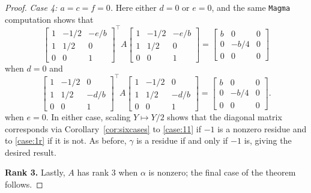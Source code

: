 \documentclass[10pt,a4paper]{amsart}
\numberwithin{equation}{section}
\numberwithin{figure}{section}
\numberwithin{table}{section}
\theoremstyle{definition}
\theoremstyle{plain}
\theoremstyle{remark}
\theoremstyle{plain}
\theoremstyle{definition}
\theoremstyle{plain}
\theoremstyle{plain}
\begin{document}
\begin{proof}
\emph{Case 4: $a=c=f=0$.} Here either $d=0$ or $e=0$, and the same \texttt{Magma} computation shows that
		\begin{equation*}
		\begin{bmatrix}
		1 & -1/2 & -e/b\\
		1 & 1/2 & 0\\
		0 & 0 & 1
		\end{bmatrix}^\top\!
		A
		\begin{bmatrix}
		1 & -1/2 & -e/b\\
		1 & 1/2 & 0\\
		0 & 0 & 1
		\end{bmatrix}
		=
		\begin{bmatrix}
		b&0&0\\
		0&-b/4&0\\
		0&0&0
		\end{bmatrix}
\end{equation*}
when $d=0$ and
\begin{equation*}
		\begin{bmatrix}
		1 & -1/2 & 0\\
		1 & 1/2 & -d/b\\
		0 & 0 & 1
		\end{bmatrix}^\top\!
		A
		\begin{bmatrix}
		1 & -1/2 & 0\\
		1 & 1/2 & -d/b\\
		0 & 0 & 1
		\end{bmatrix}
		=
		\begin{bmatrix}
		b&0&0\\
		0&-b/4&0\\
		0&0&0
		\end{bmatrix}.
		\end{equation*}
when $e=0$.
		In either case, scaling $Y\mapsto Y/2$ shows that the diagonal matrix corresponds via Corollary~\ref{cor:sixcases} to \eqref{case:11} if $-1$ is a nonzero residue and to \eqref{case:1r} if it is not. As before, $\gamma$ is a residue if and only if $-1$ is, giving the desired result.

		\textbf{Rank 3.} Lastly, $A$ has rank $3$ when $\alpha$ is nonzero; the final case of the theorem follows.
	\end{proof}
	
\end{document}
